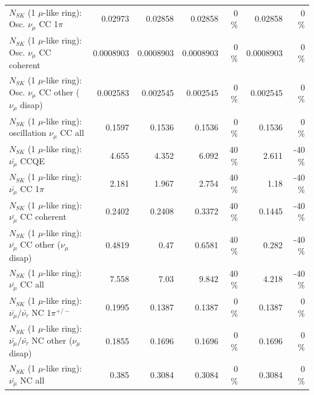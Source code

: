 \begin{table}
\begin{tabular}{| l | r | r | r  r | r  r |}
                          $N_{SK}$ (1 $\mu$-like ring): Osc. $\nu_\mu$ CC 1$\pi$ &         0.02973 &         0.02858 &         0.02858 &        0 \%  &         0.02858 &        0 \%  \\ 
                        $N_{SK}$ (1 $\mu$-like ring): Osc. $\nu_\mu$ CC coherent &       0.0008903 &       0.0008903 &       0.0008903 &        0 \%  &       0.0008903 &        0 \%  \\ 
         $N_{SK}$ (1 $\mu$-like ring): Osc. $\nu_\mu$ CC other ($\nu_\mu$ disap) &        0.002583 &        0.002545 &        0.002545 &        0 \%  &        0.002545 &        0 \%  \\ 
                      $N_{SK}$ (1 $\mu$-like ring): oscillation $\nu_\mu$ CC all &          0.1597 &          0.1536 &          0.1536 &        0 \%  &          0.1536 &        0 \%  \\ 
\hline
\hline
                              $N_{SK}$ (1 $\mu$-like ring): $\bar{\nu_\mu}$ CCQE &           4.655 &           4.352 &           6.092 &       40 \%  &           2.611 &      -40 \%  \\ 
                         $N_{SK}$ (1 $\mu$-like ring): $\bar{\nu_\mu}$ CC 1$\pi$ &           2.181 &           1.967 &           2.754 &       40 \%  &            1.18 &      -40 \%  \\ 
                       $N_{SK}$ (1 $\mu$-like ring): $\bar{\nu_\mu}$ CC coherent &          0.2402 &          0.2408 &          0.3372 &       40 \%  &          0.1445 &      -40 \%  \\ 
        $N_{SK}$ (1 $\mu$-like ring): $\bar{\nu_\mu}$ CC other ($\nu_\mu$ disap) &          0.4819 &            0.47 &          0.6581 &       40 \%  &           0.282 &      -40 \%  \\ 
                          $N_{SK}$ (1 $\mu$-like ring): $\bar{\nu_{\mu}}$ CC all &           7.558 &            7.03 &           9.842 &       40 \%  &           4.218 &      -40 \%  \\ 
\hline
  $N_{SK}$ (1 $\mu$-like ring): $\bar{\nu_\mu}$/$\bar{\nu_\tau}$ NC 1$\pi^{+/-}$ &          0.1995 &          0.1387 &          0.1387 &        0 \%  &          0.1387 &        0 \%  \\ 
$N_{SK}$ (1 $\mu$-like ring): $\bar{\nu_\mu}$/$\bar{\nu_\tau}$ NC other ($\nu_\mu$ disap) &          0.1855 &          0.1696 &          0.1696 &        0 \%  &          0.1696 &        0 \%  \\ 
                          $N_{SK}$ (1 $\mu$-like ring): $\bar{\nu_{\mu}}$ NC all &           0.385 &          0.3084 &          0.3084 &        0 \%  &          0.3084 &        0 \%  \\ 

\end{tabular}
\end{table}
